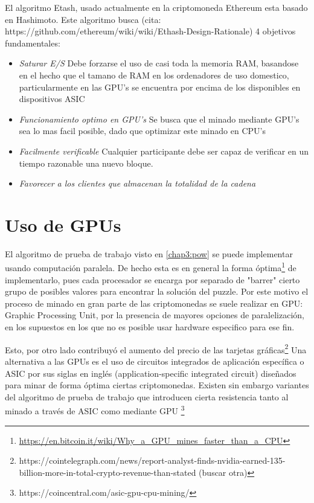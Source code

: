 El algoritmo Etash, usado actualmente en la criptomoneda Ethereum esta basado en Hashimoto. Este algoritmo busca (cita: https://github.com/ethereum/wiki/wiki/Ethash-Design-Rationale) 4 objetivos fundamentales:
\begin{itemize}
    \item \textit{Saturar E/S} Debe forzarse el uso de casi toda la memoria RAM, basandose en el hecho que el tamano de RAM en los ordenadores de uso domestico, particularmente en las GPU's se encuentra por encima de los disponibles en dispositivos ASIC
    \item \textit{Funcionamiento optimo en GPU's} Se busca que el minado mediante GPU's sea lo mas facil posible, dado que optimizar este minado en CPU's 
    \item \textit{Facilmente verificable} Cualquier participante debe ser capaz de verificar en un tiempo razonable una nuevo bloque.
    \item \textit{Favorecer a los clientes que almacenan la totalidad de la cadena}
\end{itemize}

\section{Uso de GPUs} %
El algoritmo de prueba de trabajo visto en \ref{chap3:pow} se puede implementar usando computación paralela. De hecho esta es en general la forma óptima\footnote{\url{https://en.bitcoin.it/wiki/Why_a_GPU_mines_faster_than_a_CPU}} de implementarlo, pues cada procesador se encarga por separado de "barrer" cierto grupo de posibles valores para encontrar la solución del puzzle. Por este motivo el proceso de minado en gran parte de las criptomonedas se suele realizar en GPU: Graphic Processing Unit, por la presencia de mayores opciones de paralelización, en los supuestos en los que no es posible usar hardware especifico para ese fin.

Esto, por otro lado contribuyó el aumento del precio de las tarjetas gráficas\footnote{https://cointelegraph.com/news/report-analyst-finds-nvidia-earned-135-billion-more-in-total-crypto-revenue-than-stated (buscar otra)}
Una alternativa a las GPUs es el uso de circuitos integrados de aplicación específica o ASIC por sus siglas en inglés (application-specific integrated circuit) diseñados para minar de forma óptima ciertas criptomonedas. Existen sin embargo variantes del algoritmo de prueba de trabajo que introducen cierta resistencia tanto al minado a través de ASIC como mediante GPU \footnote{https://coincentral.com/asic-gpu-cpu-mining/}

